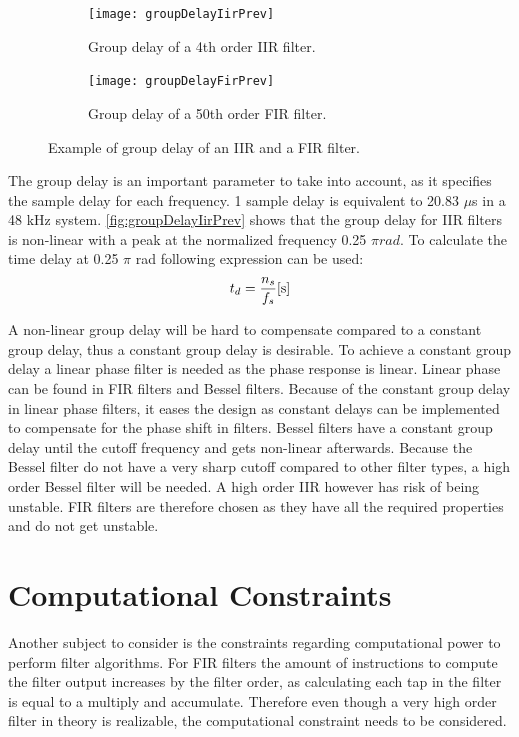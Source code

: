 \begin{figure}[H]
\centering
\begin{subfigure}[t]{0.435\textwidth}
\texttt{[image: groupDelayIirPrev]}
	\caption{Group delay of a 4th order IIR filter.}
	\label{fig:groupDelayIirPrev}
\end{subfigure}
\hspace{6mm} 
\begin{subfigure}[t]{0.47\textwidth}
\texttt{[image: groupDelayFirPrev]}
	\caption{Group delay of a 50th order FIR filter.}
	\label{fig:groupDelayFirPrev}
\end{subfigure}
\caption{Example of group delay of an IIR and a FIR filter.}
\label{fig:filterGroupDelay}
\end{figure}

The group delay is an important parameter to take into account, as it specifies the sample delay for each frequency. 1 sample delay is equivalent to 20.83 $\mu$s in a 48 kHz system. \autoref{fig:groupDelayIirPrev} shows that the group delay for IIR filters is non-linear with a peak at the normalized frequency 0.25 $\pi rad$. To calculate the time delay at 0.25 $\pi$ rad following expression can be used:
\begin{equation}
t_{d}= \frac{n_{s}}{f_s} \enhed{s}
\end{equation}
\begin{where}
\end{where}

A non-linear group delay will be hard to compensate compared to a constant group delay, thus a constant group delay is desirable. To achieve a constant group delay a linear phase filter is needed as the phase response is linear. Linear phase can be found in FIR filters and Bessel filters. Because of the constant group delay in linear phase filters, it eases the design as constant delays can be implemented to compensate for the phase shift in filters. Bessel filters have a constant group delay until the cutoff frequency and gets non-linear afterwards. Because the Bessel filter do not have a very sharp cutoff compared to other filter types, a high order Bessel filter will be needed. A high order IIR however has risk of being unstable. FIR filters are therefore chosen as they have all the required properties and do not get unstable. 


\section{Computational Constraints}
Another subject to consider is the constraints regarding computational power to perform filter algorithms. For FIR filters the amount of instructions to compute the filter output increases by the filter order, as calculating each tap in the filter is equal to a multiply and accumulate. Therefore even though a very high order filter in theory is realizable, the computational constraint needs to be considered. 

